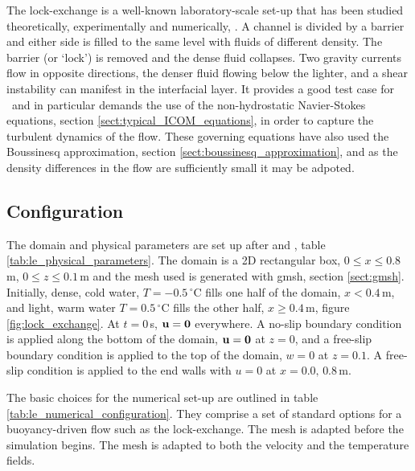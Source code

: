 The lock-exchange is a well-known laboratory-scale set-up that has been studied theoretically, experimentally and numerically, \citep{benjamin_68, klemp_94, hartel_00}. A channel is divided by a barrier and either side is filled to the same level with fluids of different density. The barrier (or ‘lock’) is removed and the dense fluid collapses. Two gravity currents flow in opposite directions, the denser fluid flowing below the lighter, and
a shear instability can manifest in the interfacial layer. It provides a good test case for \fluidity\ and in particular demands the use of the non-hydrostatic Navier-Stokes equations, section \ref{sect:typical_ICOM_equations}, in order to capture the turbulent dynamics of the flow. These governing equations have also used the Boussinesq approximation, section \ref{sect:boussinesq_approximation}, and as the density differences in the flow are sufficiently small it may be adpoted. 

\subsection{Configuration}
\label{sect:lock_exchange_configuration}

The domain and physical parameters are set up after \cite{fringer_06} and \cite{ozgokmen_07}, table \ref{tab:le_physical_parameters}. The domain is a 2D rectangular box, $0\leq x \leq 0.8\,$m, $0 \leq z \leq 0.1\,$m and the mesh used is generated with gmsh, section \ref{sect:gmsh}. Initially, dense, cold water, $T = -0.5\,^\circ$C fills one half of the domain, $x<0.4\,$m, and light, warm water $T = 0.5\,^\circ$C fills the other half, $x\geq0.4\,$m, figure \ref{fig:lock_exchange}. At $t=0\,$s, ${\bf u} = {\bf 0}$ everywhere. A no-slip boundary condition is applied along the bottom of the domain, ${\bf u = 0}$ at $z=0$, and a free-slip boundary condition is applied to the top of the domain, $w = 0$ at $z = 0.1$. A free-slip condition is applied to the end walls with $u=0$ at $x = 0.0,\, 0.8\,$m.

The basic choices for the numerical set-up are outlined in table \ref{tab:le_numerical_configuration}. They comprise a set of standard options for a buoyancy-driven flow such as the lock-exchange. The mesh is adapted before the simulation begins. The mesh is adapted to both the velocity and the temperature fields.  

